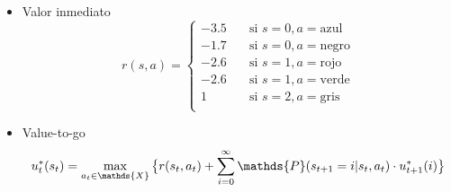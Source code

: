 \documentclass[letterpaper,10pt]{article}
\begin{document}
\begin{enumerate}
\begin{itemize}
            
            \item Valor inmediato
            \[
            r(s, a) =
                 \begin{cases}
                    -3.5 & \quad \text{si } s=0, a =\text{azul} \\ 
                    -1.7 & \quad \text{si } s=0, a =\text{negro} \\ 
                    -2.6 & \quad \text{si } s=1, a =\text{rojo} \\ 
                    -2.6 & \quad \text{si } s=1, a =\text{verde} \\ 
                    1 & \quad \text{si } s=2, a =\text{gris} \\ 
                 \end{cases}
            \]
            
            \item Value-to-go
            $$ u^*_t(s_t) = \max_{a_t \in \mathds{X}} \big{\{}r(s_t, a_t) + \sum\limits_{i=0}^{\infty}\mathds{P}(s_{t+1}=i | s_t, a_t) \cdot u^*_{t+1}(i)\big{\}} $$
            

\end{itemize}
\end{enumerate}
\end{document}
